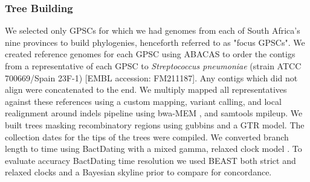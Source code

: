 \documentclass{article}
\begin{document}
\subsubsection{Tree Building}
We selected only GPSCs for which we had genomes from each of South Africa's nine provinces to build phylogenies, henceforth referred to as "focus GPSCs". We created reference genomes for each GPSC using ABACAS to order the contigs from a representative of each GPSC to \textit{Streptococcus pneumoniae }(strain ATCC 700669/Spain 23F-1) [EMBL accession: FM211187]\cite{assefaABACASAlgorithmbasedAutomatic2009}. Any contigs which did not align were concatenated to the end.  We multiply mapped all representatives against these references using a custom mapping, variant calling, and local realignment around indels pipeline using bwa-MEM \cite{liFastAccurateShort2009}, and samtools mpileup\cite{liFastAccurateShort2009}. We built trees masking recombinatory regions using gubbins\cite{croucherRapidPhylogeneticAnalysis2015} and a GTR model. The collection dates for the tips of the trees were compiled. We converted branch length to time using BactDating with a mixed gamma, relaxed clock model \cite{didelotBayesianInferenceAncestral2018}. To evaluate accuracy BactDating time resolution we used BEAST both strict and relaxed clocks and a Bayesian skyline prior to compare for concordance.
\end{document}

